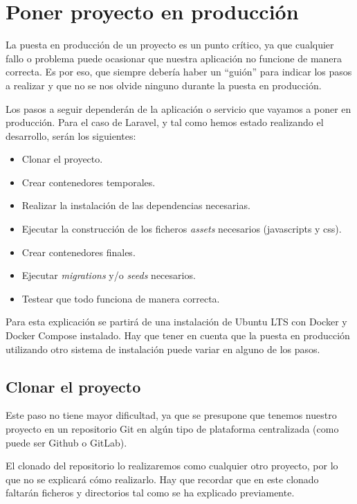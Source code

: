 \chapter{Poner proyecto en producción}

La puesta en producción de un proyecto es un punto crítico, ya que cualquier fallo o problema puede ocasionar que nuestra aplicación no funcione de manera correcta. Es por eso, que siempre debería haber un “guión” para indicar los pasos a realizar y que no se nos olvide ninguno durante la puesta en producción.

Los pasos a seguir dependerán de la aplicación o servicio que vayamos a poner en producción. Para el caso de Laravel, y tal como hemos estado realizando el desarrollo, serán los siguientes:

\begin{itemize}
    \item Clonar el proyecto.
    \item Crear contenedores temporales.
    \item Realizar la instalación de las dependencias necesarias.
    \item Ejecutar la construcción de los ficheros \textit{assets} necesarios (javascripts y css).
    \item Crear contenedores finales.
    \item Ejecutar \textit{migrations} y/o \textit{seeds} necesarios.
    \item Testear que todo funciona de manera correcta.
\end{itemize}

Para esta explicación se partirá de una instalación de Ubuntu LTS con Docker y Docker Compose instalado. Hay que tener en cuenta que la puesta en producción utilizando otro sistema de instalación puede variar en alguno de los pasos.



\section{Clonar el proyecto}

Este paso no tiene mayor dificultad, ya que se presupone que tenemos nuestro proyecto en un repositorio Git en algún tipo de plataforma centralizada (como puede ser Github o GitLab).

El clonado del repositorio lo realizaremos como cualquier otro proyecto, por lo que no se explicará cómo realizarlo. Hay que recordar que en este clonado faltarán ficheros y directorios tal como se ha explicado previamente.


